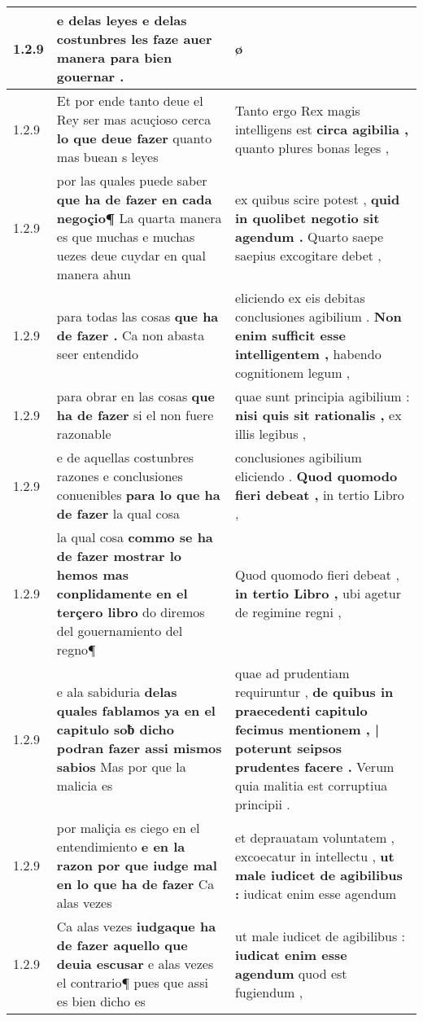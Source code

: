 \begin{tabular}{|p{1cm}|p{6.5cm}|p{6.5cm}|}
1.2.9 & e delas leyes \textbf{ e delas costunbres les faze auer manera } para bien gouernar . & ø \\\hline
1.2.9 & Et por ende tanto deue el Rey ser mas acuçioso cerca \textbf{ lo que deue fazer } quanto mas buean s leyes & Tanto ergo Rex magis intelligens est \textbf{ circa agibilia , } quanto plures bonas leges , \\\hline
1.2.9 & por las quales puede saber \textbf{ que ha de fazer en cada negoçio¶ } La quarta manera es que muchas e muchas uezes deue cuydar en qual manera ahun & ex quibus scire potest , \textbf{ quid in quolibet negotio sit agendum . } Quarto saepe saepius excogitare debet , \\\hline
1.2.9 & para todas las cosas \textbf{ que ha de fazer . } Ca non abasta seer entendido & eliciendo ex eis debitas conclusiones agibilium . \textbf{ Non enim sufficit esse intelligentem , } habendo cognitionem legum , \\\hline
1.2.9 & para obrar en las cosas \textbf{ que ha de fazer } si el non fuere razonable & quae sunt principia agibilium : \textbf{ nisi quis sit rationalis , } ex illis legibus , \\\hline
1.2.9 & e de aquellas costunbres razones e conclusiones conuenibles \textbf{ para lo que ha de fazer } la qual cosa & conclusiones agibilium eliciendo . \textbf{ Quod quomodo fieri debeat , } in tertio Libro , \\\hline
1.2.9 & la qual cosa \textbf{ commo se ha de fazer mostrar lo hemos mas conplidamente en el terçero libro } do diremos del gouernamiento del regno¶ & Quod quomodo fieri debeat , \textbf{ in tertio Libro , } ubi agetur de regimine regni , \\\hline
1.2.9 & e ala sabiduria \textbf{ delas quales fablamos ya en el capitulo soƀ dicho podran fazer assi mismos sabios } Mas por que la malicia es & quae ad prudentiam requiruntur , \textbf{ de quibus in praecedenti capitulo fecimus mentionem , | poterunt seipsos prudentes facere . } Verum quia malitia est corruptiua principii . \\\hline
1.2.9 & por maliçia es ciego en el entendimiento \textbf{ e en la razon por que iudge mal en lo que ha de fazer } Ca alas vezes & et deprauatam voluntatem , excoecatur in intellectu , \textbf{ ut male iudicet de agibilibus : } iudicat enim esse agendum \\\hline
1.2.9 & Ca alas vezes \textbf{ iudgaque ha de fazer aquello que deuia escusar } e alas vezes el contrario¶ pues que assi es bien dicho es & ut male iudicet de agibilibus : \textbf{ iudicat enim esse agendum } quod est fugiendum , \\\hline

\end{tabular}
